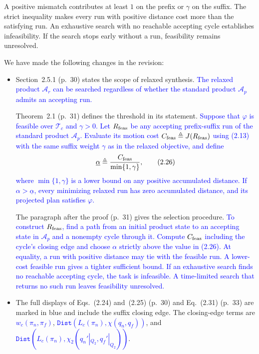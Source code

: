 \documentclass[11pt]{article}
\newcommand{\change}[1]{\textcolor{blue}{#1}}
\begin{document}
A positive mismatch contributes at least $1$ on the prefix or $\gamma$ on
the suffix. The strict inequality makes every run with positive distance cost
more than the satisfying run. An exhaustive search with no reachable accepting
cycle establishes infeasibility. If the search stops early without a run,
feasibility remains unresolved.

We have made the following changes in the revision:
\begin{itemize}
\item Section~2.5.1 (p.~30) states the scope of relaxed synthesis.
\change{The relaxed product $\mathcal{A}_r$ can be searched regardless of whether
the standard product $\mathcal{A}_p$ admits an accepting run.}

Theorem~2.1 (p.~31) defines the threshold in its statement.
\change{Suppose that $\varphi$ is feasible over $\mathcal{T}_c$ and $\gamma>0$.
Let $R_{\textup{feas}}$ be any accepting prefix-suffix run of the standard
product $\mathcal{A}_p$. Evaluate its motion cost
$C_{\textup{feas}}\triangleq J(R_{\textup{feas}})$ using
(2.13) with the same suffix weight $\gamma$ as in the
relaxed objective, and define
\begin{equation*}
\underline{\alpha}\triangleq
\frac{C_{\textup{feas}}}{\min\{1,\gamma\}},
\tag{2.26}
\end{equation*}
where $\min\{1,\gamma\}$ is a lower bound on any positive accumulated distance.
If $\alpha>\underline{\alpha}$, every minimizing relaxed run has zero
accumulated distance, and its projected plan satisfies $\varphi$.}

The paragraph after the proof (p.~31) gives the selection procedure.
\change{To construct $R_{\textup{feas}}$, find a path from an initial product state
to an accepting state in $\mathcal{A}_p$ and a nonempty cycle through it.
Compute $C_{\textup{feas}}$ including the cycle's closing edge and choose
$\alpha$ strictly above the value in (2.26). At equality, a run with
positive distance may tie with the feasible run. A lower-cost feasible run
gives a tighter sufficient bound. If an exhaustive search finds no reachable
accepting cycle, the task is infeasible. A time-limited search that returns
no such run leaves feasibility unresolved.}

\item The full displays of Eqs.~(2.24) and~(2.25) (p.~30) and Eq.~(2.31) (p.~33)
are marked in blue and include the suffix closing edge. The closing-edge
terms are \change{$w_c(\pi_n,\pi_f)$},
\change{$\texttt{Dist}(L_c(\pi_n),\allowbreak\chi(q_n,q_f))$}, and
\change{$\texttt{Dist}(L_c(\pi_n),\allowbreak\chi_2(q_n'|_{Q_2},q_f'|_{Q_2}))$}.


\end{itemize}
\end{document}
